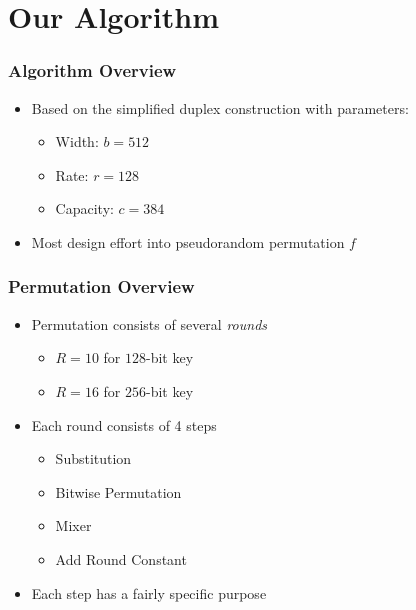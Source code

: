 \section{Our Algorithm}
\begin{frame}
\frametitle{Algorithm Overview}
\begin{itemize}
  \item Based on the simplified duplex construction with parameters:
  \begin{itemize}
    \item Width: $b = 512$
    \item Rate: $r = 128$ 
    \item Capacity: $c = 384$ 
  \end{itemize}
  \item Most design effort into pseudorandom permutation $f$
\end{itemize}
\end{frame}

\begin{frame}
\frametitle{Permutation Overview}
\begin{itemize}
  \item Permutation consists of several \emph{rounds}
  \begin{itemize}
    \item $R = 10$ for $128$-bit key
    \item $R = 16$ for $256$-bit key
  \end{itemize}
  \item Each round consists of 4 steps
  \begin{itemize}
    \item Substitution
    \item Bitwise Permutation
    \item Mixer
    \item Add Round Constant
  \end{itemize}
  \item Each step has a fairly specific purpose
\end{itemize}
\end{frame}

